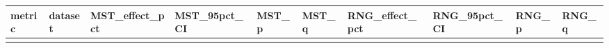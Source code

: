 \documentclass[
]{article}
\newcounter{none} %
\providecommand{\DIFadd}[1]{{\protect\color{blue} #1}} %
\providecommand{\DIFaddbegin}{} %
\begin{document}
\DIFaddbegin {\def\LTcaptype{none} %
\begin{longtable}[]{@{}
  >{\raggedright\arraybackslash}p{}
  >{\raggedright\arraybackslash}p{}
  >{\raggedright\arraybackslash}p{}
  >{\raggedright\arraybackslash}p{}
  >{\raggedright\arraybackslash}p{}
  >{\raggedright\arraybackslash}p{}
  >{\raggedright\arraybackslash}p{}
  >{\raggedright\arraybackslash}p{}
  >{\raggedright\arraybackslash}p{}
  >{\raggedright\arraybackslash}p{}@{}}
\toprule\noalign{}
\begin{minipage}[b]{\linewidth}\raggedright
\DIFadd{metric
}\end{minipage} & \begin{minipage}[b]{\linewidth}\raggedright
\DIFadd{dataset
}\end{minipage} & \begin{minipage}[b]{\linewidth}\raggedright
\DIFadd{MST\_effect\_pct
}\end{minipage} & \begin{minipage}[b]{\linewidth}\raggedright
\DIFadd{MST\_95pct\_CI
}\end{minipage} & \begin{minipage}[b]{\linewidth}\raggedright
\DIFadd{MST\_p
}\end{minipage} & \begin{minipage}[b]{\linewidth}\raggedright
\DIFadd{MST\_q
}\end{minipage} & \begin{minipage}[b]{\linewidth}\raggedright
\DIFadd{RNG\_effect\_pct
}\end{minipage} & \begin{minipage}[b]{\linewidth}\raggedright
\DIFadd{RNG\_95pct\_CI
}\end{minipage} & \begin{minipage}[b]{\linewidth}\raggedright
\DIFadd{RNG\_p
}\end{minipage} & \begin{minipage}[b]{\linewidth}\raggedright
\DIFadd{RNG\_q
}\end{minipage} \\
\midrule\noalign{}

\end{longtable}}
\end{document}
